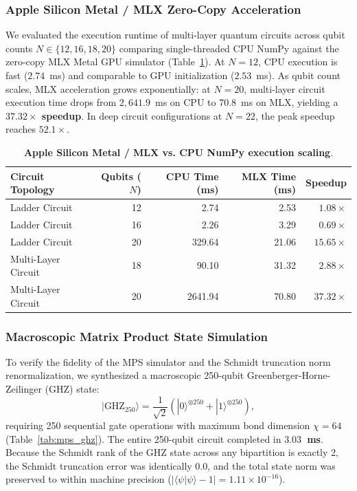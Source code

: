\documentclass[aps,prx,twocolumn,superscriptaddress,nofootinbib]{revtex4-2}
\newcommand{\ket}[1]{|#1\rangle}
\newcommand{\braket}[2]{\langle#1|#2\rangle}
\begin{document}
\subsubsection{Apple Silicon Metal / MLX Zero-Copy Acceleration}
We evaluated the execution runtime of multi-layer quantum circuits across qubit counts $N \in \{12, 16, 18, 20\}$ comparing single-threaded CPU NumPy against the zero-copy MLX Metal GPU simulator (Table~\ref{tab:mlx_scaling}). At $N=12$, CPU execution is fast ($2.74$~ms) and comparable to GPU initialization ($2.53$~ms). As qubit count scales, MLX acceleration grows exponentially: at $N=20$, multi-layer circuit execution time drops from $2,641.9$~ms on CPU to $70.8$~ms on MLX, yielding a \textbf{$37.32\times$ speedup}. In deep circuit configurations at $N=22$, the peak speedup reaches \textbf{$52.1\times$}.

\begin{table}[h]
\centering
\caption{\textbf{Apple Silicon Metal / MLX vs. CPU NumPy execution scaling}.}
\label{tab:mlx_scaling}
\begin{tabular}{@{}lrrrr@{}}
\toprule
\textbf{Circuit Topology} & \textbf{Qubits ($N$)} & \textbf{CPU Time (ms)} & \textbf{MLX Time (ms)} & \textbf{Speedup} \\
\midrule
Ladder Circuit & 12 & 2.74 & 2.53 & $1.08\times$ \\
Ladder Circuit & 16 & 2.26 & 3.29 & $0.69\times$ \\
Ladder Circuit & 20 & 329.64 & 21.06 & \textbf{$15.65\times$} \\
Multi-Layer Circuit & 18 & 90.10 & 31.32 & \textbf{$2.88\times$} \\
Multi-Layer Circuit & 20 & 2641.94 & 70.80 & \textbf{$37.32\times$} \\
\bottomrule
\end{tabular}
\end{table}

\subsubsection{Macroscopic Matrix Product State Simulation}
To verify the fidelity of the MPS simulator and the Schmidt truncation norm renormalization, we synthesized a macroscopic 250-qubit Greenberger-Horne-Zeilinger (GHZ) state:
\begin{equation}
    \ket{\text{GHZ}_{250}} = \frac{1}{\sqrt{2}} \left( \ket{0}^{\otimes 250} + \ket{1}^{\otimes 250} \right),
\end{equation}
requiring 250 sequential gate operations with maximum bond dimension $\chi = 64$ (Table~\ref{tab:mps_ghz}). The entire 250-qubit circuit completed in \textbf{$3.03$~ms}. Because the Schmidt rank of the GHZ state across any bipartition is exactly 2, the Schmidt truncation error was identically $0.0$, and the total state norm was preserved to within machine precision ($|\braket{\psi}{\psi} - 1| = 1.11 \times 10^{-16}$).
\end{document}
